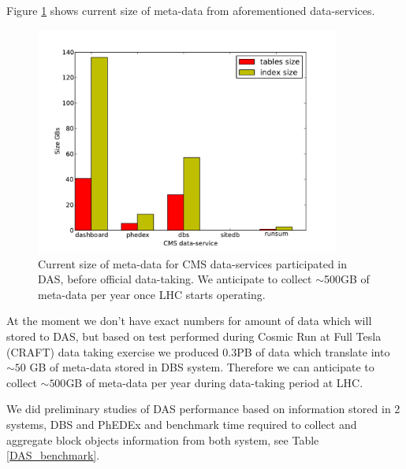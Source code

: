\documentclass[a4paper]{jpconf}
\begin{document}
Figure \ref{db_size} shows current size of meta-data from aforementioned data-services.
\begin{figure}[htb]
\centering
\includegraphics[width=100mm]{db_size.pdf}
\caption{
Current size of meta-data for CMS data-services participated in DAS, before
official data-taking. We anticipate to collect $\sim$500GB of meta-data
per year once LHC starts operating.
}
\label{db_size}
\end{figure}

At the moment we don't have exact numbers for amount of data which will stored to DAS,
but based on test performed during 
Cosmic Run at Full Tesla (CRAFT) data taking \cite{CRAFT09}
exercise we produced 0.3PB of data which
translate into $\sim50$ GB of meta-data stored in DBS system. Therefore
we can anticipate to collect $\sim500$GB of meta-data per year during data-taking period
at LHC.

We did preliminary studies of DAS performance based on information stored
in 2 systems, DBS and PhEDEx and benchmark time required to collect and 
aggregate block objects information from both system, see Table \ref{DAS_benchmark}.
\end{document}
